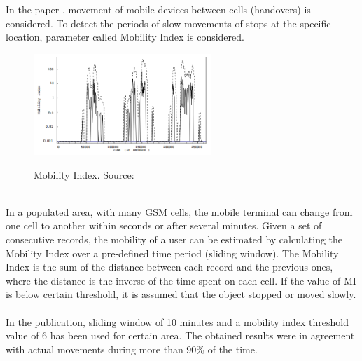 In the paper \cite{MobilityIndexGIS}, movement of mobile devices between cells (handovers) is considered. To detect the periods of slow movements of stops at the specific location, parameter called Mobility Index is considered. 
\begin{figure}[!ht]
	\centering
	\includegraphics[width=0.6\textwidth]{images/intro_mobility_index.png}\\
	\caption{Mobility Index. Source: \cite{MobilityIndexGIS}}
	\label{fig:introduction_mob_index}
\end{figure}
\\
In a populated area, with many GSM cells, the mobile
terminal can change from one cell to another within
seconds or after several minutes. Given a set of consecutive records, the mobility of a user can be estimated by calculating the Mobility Index over a pre-defined time period (sliding window). The Mobility Index is the sum of the distance between each record and the previous ones, where the distance is the inverse of the time spent on each cell. If the value of MI is below certain threshold, it is assumed that the object stopped or moved slowly. 
\\\\
In the publication, sliding window of 10 minutes and a mobility index threshold value of 6 has been used for certain area. The obtained results were in agreement with actual movements during more than 90\% of the time. 